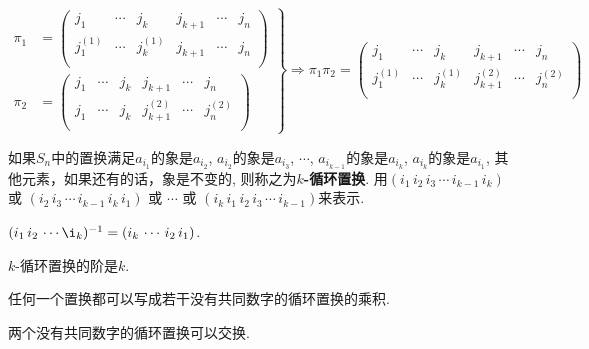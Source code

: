 \begin{Theorem}
$$
\left.
\begin{aligned}
\pi_1 &= \begin{pmatrix} 
j_1       & \cdots & j_k       & j_{k+1} & \cdots & j_n \\
j_1^{(1)} & \cdots & j_k^{(1)} & j_{k+1} & \cdots & j_n \\
\end{pmatrix} \\
\pi_2 &= \begin{pmatrix} 
j_1       & \cdots & j_k       & j_{k+1}       & \cdots & j_n      \\
j_1       & \cdots & j_k       & j_{k+1}^{(2)} & \cdots & j_n^{(2)} \\
\end{pmatrix} 
\end{aligned}
\right\}
\Rightarrow
\pi_1 \pi_2 = \begin{pmatrix} 
j_1       & \cdots & j_k       & j_{k+1}       & \cdots & j_n \\
j_1^{(1)} & \cdots & j_k^{(1)} & j_{k+1}^{(2)} & \cdots & j_n^{(2)} \\
\end{pmatrix}
$$
\end{Theorem}

\begin{Definition}[$k$-循环置换]
如果$S_n$中的置换满足$a_{i_1}$的象是$a_{i_2}$, $a_{i_2}$的象是$a_{i_3}$, $\cdots$, 
$a_{i_{k-1}}$的象是$a_{i_k}$, $a_{i_{k}}$的象是$a_{i_1}$, 其他元素，如果还有的话，象是不变的, 则称之为\textbf{$k$-循环置换}.
用$(i_1 \, i_2 \, i_3 \, \cdots \, i_{k-1} \, i_k)$ 或 
$(i_2 \, i_3 \, \cdots \, i_{k-1} \, i_k \, i_1)$ 或 $\cdots$ 或   
$( i_k \, i_1 \, i_2 \, i_3 \, \cdots \, i_{k-1})$来表示.
\end{Definition}

\begin{Theorem}
$(i_1 \, i_2 \, \cdots \i_k)^{-1} = (i_k \, \cdots \, i_2 \, i_1)$.
\end{Theorem}

\begin{Theorem}
$k$-循环置换的阶是$k$.
\end{Theorem}

\begin{Theorem}
任何一个置换都可以写成若干没有共同数字的循环置换的乘积.
\end{Theorem}

\begin{Theorem}
两个没有共同数字的循环置换可以交换.
\end{Theorem}

